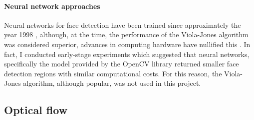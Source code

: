 

\paragraph{Neural network approaches}
Neural networks for face detection have been trained since approximately the year 1998 \cite{655647}, although, at the time, the performance of the Viola-Jones algorithm was considered superior, 
advances in computing hardware have nullified this \cite{v-j-vs-ann}. In fact, I conducted early-stage experiments which suggested that neural networks, specifically the model provided by the OpenCV library  \cite{OpenCV}
returned smaller face detection regions with similar computational costs. For this reason, the Viola-Jones algorithm, although popular, was not used in this project.

\subsection{Optical flow}

